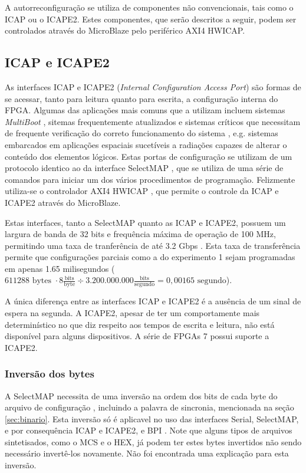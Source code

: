 \documentclass[11pt,a4paper,oneside]{book}
\begin{document}
A autorreconfiguração se utiliza de componentes não convencionais, tais como o ICAP ou o ICAPE2.
Estes componentes, que serão descritos a seguir, podem ser controlados através do MicroBlaze pelo periférico AXI4 HWICAP.

\subsection{ICAP e ICAPE2}
As interfaces ICAP e ICAPE2 (\textit{Internal Configuration Access Port}) são formas de se acessar, tanto para leitura quanto para escrita, a configuração interna do FPGA.
Algumas das aplicações mais comuns que a utilizam incluem sistemas \textit{MultiBoot} \cite{xapp468, xapp1100}, sitemas frequentemente atualizados e sistemas críticos que necessitam de frequente verificação do correto funcionamento do sistema \cite{xapp468, xapp887}, e.g. sistemas embarcados em aplicações espaciais sucetíveis a radiações capazes de alterar o conteúdo dos elementos lógicos. 
Estas portas de configuração se utilizam de um protocolo identico ao da interface SelectMAP \cite{wp374, ug702}, que se utiliza de uma série de comandos para iniciar um dos vários procedimentos de programação.
Felizmente utiliza-se o controlador AXI4 HWICAP \cite{ds817}, que permite o controle da ICAP e ICAPE2 através do MicroBlaze.

Estas interfaces, tanto a SelectMAP quanto as ICAP e ICAPE2, possuem um largura de banda de 32 bits e frequência máxima de operação de 100 MHz, permitindo uma taxa de tranferência de até 3.2 Gbps \cite{ug702}.
Esta taxa de transferência permite que configurações parciais como a do experimento 1 sejam programadas em apenas 1.65 milisegundos ($611288\text{ bytes }\cdot8\frac{\text{bits}}{\text{byte}}\div3.200.000.000\frac{\text{bits}}{\text{segundo}} = 0,00165 \text{ segundo}$).

A única diferença entre as interfaces ICAP e ICAPE2 é a ausência de um sinal de espera na segunda.
A ICAPE2, apesar de ter um comportamente mais determinístico no que diz respeito aos tempos de escrita e leitura, não está disponível para alguns dispositivos.
A série de FPGAs 7 possui suporte a ICAPE2.

\subsubsection{Inversão dos bytes}
A SelectMAP necessita de uma inversão na ordem dos bits de cada byte do arquivo de configuração \cite{xapp502}, incluindo a palavra de sincronia, mencionada na seção \ref{sec:binario}.
Esta inversão só é aplicavel no uso das interfaces Serial, SelectMAP, e por consequência ICAP e ICAPE2, e BPI \cite{ug470}.
Note que alguns tipos de arquivos sintetisados, como o MCS e o HEX, já podem ter estes bytes invertidos não sendo necessário invertê-los novamente.
Não foi encontrada uma explicação para esta inversão.
\end{document}
